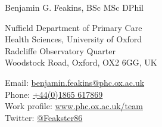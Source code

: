 \documentclass[10pt,a4paper]{article}
\def\name{Benjamin G. Feakins, BSc MSc DPhil}
\begin{document}
{\huge \name}

\vspace{0.25in}

\begin{minipage}[t]{0.5\textwidth}
  \raggedright
  Nuffield Department of Primary Care \\
  Health Sciences, University of Oxford \\
  Radcliffe Observatory Quarter \\
  Woodstock Road, Oxford, OX2 6GG, UK \\
\end{minipage}\begin{minipage}[t]{0.5\textwidth}
  \raggedright
  Email: \href{mailto:benjamin.feakins@phc.ox.ac.uk}{benjamin.feakins@phc.ox.ac.uk} \\
  Phone: \href{tel:441865617869}{+44(0)1865 617869} \\
  Work profile: \href{https://www.phc.ox.ac.uk/team/ben-feakins}{www.phc.ox.ac.uk/team} \\
  Twitter:  \href{https://twitter.com/Feakster86}{@Feakster86} \\
\end{minipage}

\vspace{0.25in}

\sloppy
\end{document}
